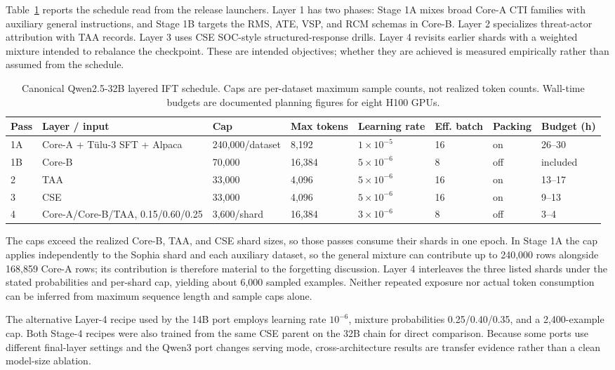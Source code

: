 \documentclass[conference]{IEEEtran}
\begin{document}
Table~\ref{tab:train} reports the schedule read from the release launchers. Layer 1 has two phases: Stage 1A mixes broad Core-A CTI families with auxiliary general instructions, and Stage 1B targets the RMS, ATE, VSP, and RCM schemas in Core-B. Layer 2 specializes threat-actor attribution with TAA records. Layer 3 uses CSE SOC-style structured-response drills. Layer 4 revisits earlier shards with a weighted mixture intended to rebalance the checkpoint. These are intended objectives; whether they are achieved is measured empirically rather than assumed from the schedule.

\begin{table}[t]
\caption{Canonical Qwen2.5-32B layered IFT schedule. Caps are per-dataset maximum sample counts, not realized token counts. Wall-time budgets are documented planning figures for eight H100 GPUs.}
\label{tab:train}
\centering
\scriptsize
\setlength{\tabcolsep}{3.2pt}
\begin{tabular}{@{}llllllll@{}}
\toprule
Pass & Layer / input & Cap & Max tokens & Learning rate & Eff. batch & Packing & Budget (h) \\
\midrule
1A & Core-A + T\"ulu-3 SFT + Alpaca & 240,000/dataset & 8,192 & $1\times10^{-5}$ & 16 & on & 26--30 \\
1B & Core-B & 70,000 & 16,384 & $5\times10^{-6}$ & 8 & off & included \\
2 & TAA & 33,000 & 4,096 & $5\times10^{-6}$ & 16 & on & 13--17 \\
3 & CSE & 33,000 & 4,096 & $5\times10^{-6}$ & 16 & on & 9--13 \\
4 & Core-A/Core-B/TAA, 0.15/0.60/0.25 & 3,600/shard & 16,384 & $3\times10^{-6}$ & 8 & off & 3--4 \\
\bottomrule
\end{tabular}
\end{table}

The caps exceed the realized Core-B, TAA, and CSE shard sizes, so those passes consume their shards in one epoch. In Stage 1A the cap applies independently to the Sophia shard and each auxiliary dataset, so the general mixture can contribute up to 240,000 rows alongside 168,859 Core-A rows; its contribution is therefore material to the forgetting discussion. Layer 4 interleaves the three listed shards under the stated probabilities and per-shard cap, yielding about 6,000 sampled examples. Neither repeated exposure nor actual token consumption can be inferred from maximum sequence length and sample caps alone.

The alternative Layer-4 recipe used by the 14B port employs learning rate $10^{-6}$, mixture probabilities 0.25/0.40/0.35, and a 2,400-example cap. Both Stage-4 recipes were also trained from the same CSE parent on the 32B chain for direct comparison. Because some ports use different final-layer settings and the Qwen3 port changes serving mode, cross-architecture results are transfer evidence rather than a clean model-size ablation.
\end{document}
